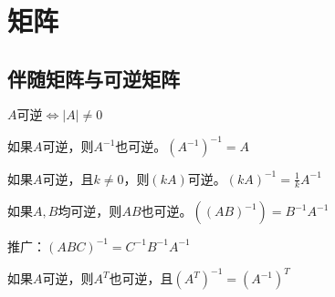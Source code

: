 \section{矩阵}

\subsection{伴随矩阵与可逆矩阵}

$A \mbox{可逆} \Longleftrightarrow |A| \neq 0 $

$\mbox{如果}A\mbox{可逆，则}A^{-1}\mbox{也可逆。} (A^{-1})^{-1} = A$

$\mbox{如果}A\mbox{可逆，且}k \neq 0\mbox{，则}(kA)\mbox{可逆。} (kA)^{-1} = \frac{1}{k}A^{-1}$


$\mbox{如果}A, B\mbox{均可逆，则}AB\mbox{也可逆。} ((AB)^{-1}) = B^{-1}A^{-1}$

$\mbox{推广：}(ABC)^{-1}=C^{-1}B^{-1}A^{-1}$


$\mbox{如果}A\mbox{可逆，则}A^{T}\mbox{也可逆，且} (A^{T})^{-1} = (A^{-1})^T$